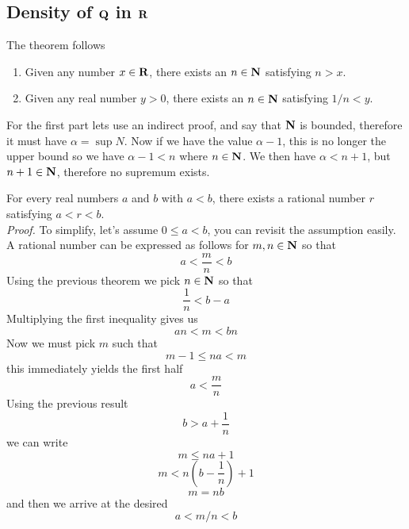 \subsection{Density of $ \Q $ in $ \R $}
\begin{theorem}
	The theorem follows
	\begin{enumerate}
		\item Given any number $ x \in \textbf{R}$, there exists an $ n \in \textbf{N} $ satisfying $ n > x $. 
		\item Given any real number $ y > 0 $, there exists an $ n \in \textbf{N} $ satisfying $ 1/n < y $.
	\end{enumerate}
	For the first part lets use an indirect proof, and say that $ \textbf{N} $ is bounded, therefore it must have $ \alpha = \sup N $. Now if we have the value $ \alpha - 1 $, this is no longer the upper bound so we have $ \alpha -1 < n $ where $ n \in \textbf{N} $. We then have $ \alpha < n + 1 $, but $ n+1 \in \textbf{N} $, therefore no supremum exists. 
\end{theorem}
\begin{theorem}[Density of $ \Q $ in $ \R $]
	For every real numbers $ a $ and $ b $ with $ a < b $, there exists a rational number $ r $ satisfying $ a < r < b $. \\
	\textit{Proof.} To simplify, let's assume $ 0 \leq a < b $, you can revisit the assumption easily. A rational number can be expressed as follows for $ m, n \in \textbf{N} $ so that \[ a < \dfrac{m}{n} < b\] Using the previous theorem we pick $ n \in \textbf{N} $ so that \[ \dfrac{1}{n} < b -a \] Multiplying the first inequality gives us \[ an < m < bn \] Now we must pick $ m $ such that \[ m -1 \leq na < m \] this immediately yields the first half \[ a < \dfrac{m}{n} \] Using the previous result \[ b > a + \dfrac{1}{n} \] we can write 
	\[ m \leq na + 1 \]
	\[ m < n \left(b - \dfrac{1}{n}\right) + 1 \]
	\[ m = nb \] and then we arrive at the desired 
	\[ a < m/n <b \]
\end{theorem}
